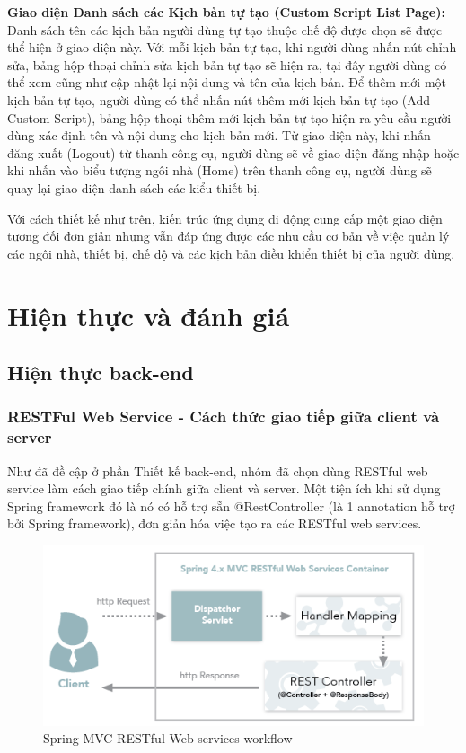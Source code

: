\documentclass[12pt,a4paper,oneside]{extbook}
\begin{document}
\textbf{Giao diện Danh sách các Kịch bản tự tạo (Custom Script List Page):} Danh sách tên các kịch bản người dùng tự tạo thuộc chế độ được chọn sẽ được thể hiện ở giao diện này. Với mỗi kịch bản tự tạo, khi người dùng nhấn nút chỉnh sửa, bảng hộp thoại chỉnh sửa kịch bản tự tạo sẽ hiện ra, tại đây người dùng có thể xem cũng như cập nhật lại nội dung và tên của kịch bản. Để thêm mới một kịch bản tự tạo, người dùng có thể nhấn nút thêm mới kịch bản tự tạo (Add Custom Script), bảng hộp thoại thêm mới kịch bản tự tạo hiện ra yêu cầu người dùng xác định tên và nội dung cho kịch bản mới. Từ giao diện này, khi nhấn đăng xuất (Logout) từ thanh công cụ, người dùng sẽ về giao diện đăng nhập hoặc khi nhấn vào biểu tượng ngôi nhà (Home) trên thanh công cụ, người dùng sẽ quay lại giao diện danh sách các kiểu thiết bị.

Với cách thiết kế như trên, kiến trúc ứng dụng di động cung cấp một giao diện tương đối đơn giản nhưng vẫn đáp ứng được các nhu cầu cơ bản về việc quản lý các ngôi nhà, thiết bị, chế độ và các kịch bản điều khiển thiết bị của người dùng.

\chapter{Hiện thực và đánh giá}

\section{Hiện thực back-end}\label{back-end-implementation}

\subsection{RESTFul Web Service - Cách thức giao tiếp giữa client và server}

Như đã đề cập ở phần Thiết kế back-end, nhóm đã chọn dùng RESTful web service làm cách giao tiếp chính giữa client và server. Một tiện ích khi sử dụng Spring framework đó là nó có hỗ trợ sẵn @RestController (là 1 annotation hỗ trợ bởi Spring framework), đơn giản hóa việc tạo ra các RESTful web services.

\begin{figure}[h]
  \centering
     \includegraphics[width=12cm]{6-spring-RESTfulWS-workflow}
  \caption{Spring MVC RESTful Web services workflow}\label{fig:6-spring-RESTfulWS-workflow}
\end{figure} 
\end{document}
